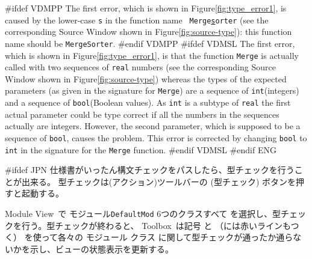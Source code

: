 \documentclass[\pformat,12pt]{article}
\newcommand{\Toolbox}{Toolbox}
\newcommand{\vdmModView}{\guicmd{Module View}}
\newcommand{\vdmModView}{\guicmd{モジュールビュー}}
\newcommand{\Toolbox}{Toolbox}
\newcommand{\vdmModView}{\guicmd{VDM View}}
\newcommand{\vdmModView}{\guicmd{VDMビュー}}
\newcommand{\guicmd}[1]{{\sf #1}}
\newcommand{\guicmd}[1]{{\gt #1}}
\begin{document}
#ifdef VDMPP
The first error, which is shown in Figure\ref{fig:type_error1}, is
caused by the lower-case {\tt s} in the function name {\tt
  Merge\underline{s}orter} (see the corresponding \guicmd{Source Window} shown in
Figure\ref{fig:source-type}): this function name should be {\tt MergeSorter}.
#endif VDMPP
#ifdef VDMSL 
The first error, which is shown in Figure\ref{fig:type_error1},
is that the function {\tt Merge} is actually  called with two sequences of
{\tt real} numbers (see the corresponding \guicmd{Source Window} shown in
Figure\ref{fig:source-type}) whereas the types of the expected
parameters (as given in the signature for 
{\tt Merge}) are a sequence of {\tt int}(integers) and a sequence of
{\tt bool}(Boolean values). As {\tt int} is a subtype of {\tt real}
the first actual parameter could be type correct if all
the numbers in the sequences actually are integers. However, the
second parameter, which is supposed to be a sequence of {\tt bool},
causes the problem.  This error is corrected by changing {\tt bool} to
{\tt int} in the signature for the {\tt Merge} function.
#endif VDMSL
#endif ENG

#ifdef JPN
仕様書がいったん構文チェックをパスしたら、型チェックを行うことが出来る。
型チェックは(\guicmd{アクション})ツールバーの  
(\guicmd{型チェック}) ボタンを押すと起動する。

\vdmModView\ で 
{
モジュール{\tt DefaultMod}
}
{
6つのクラスすべて
} 
を選択し、型チェックを行う。型チェックが終わると、 \Toolbox\ は記号
と
（には赤いラインもつく）
を使って各々の
{
モジュール
}
{
クラス
}に関して型チェックが通ったか通らないかを示し、ビューの状態表示を更新する。
\end{document}
